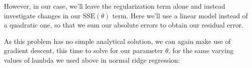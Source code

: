 \documentclass[11pt,letterpaper]{article}
\begin{document}
However, in our case, we'll leave the regularization term alone and instead investigate changes in our $\text{SSE}(\theta)$ term. Here we'll use a linear model instead of a quadratic one, so that we sum our absolute errors to obtain our residual error.

As this problem has no simple analytical solution, we can again make use of gradient descent, this time to solve for our parameter $\theta$, for the same varying values of lambda we used above in normal ridge regression:
\end{document}
